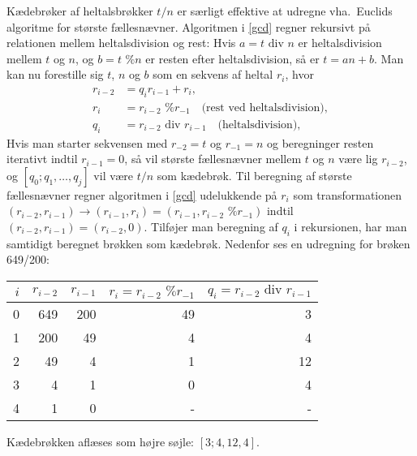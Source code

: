 Kædebrøker af heltalsbrøkker $t/n$ er særligt effektive at udregne vha.\ Euclids algoritme for største fællesnævner. Algoritmen i \ref{gcd} regner rekursivt på relationen mellem heltalsdivision og rest: Hvis $a = t \text{ div } n$ er heltalsdivision mellem $t$ og $n$, og $b = t \text{ \% } n$ er resten efter heltalsdivision, så er $t = a n + b$. Man kan nu forestille sig $t$, $n$ og $b$ som en sekvens af heltal $r_i$, hvor
\begin{align}
  r_{i-2} &= q_i r_{i-1} + r_i,
  \\r_i &= r_{i-2}\text{ \% }r_{-1}\quad\text{(rest ved heltalsdivision)},
  \\q_i &= r_{i-2}\text{ div }r_{i-1}\quad\text{(heltalsdivision)},
\end{align}
Hvis man starter sekvensen med $r_{-2} = t$ og $r_{-1}=n$ og beregninger resten iterativt indtil $r_{i-1}=0$, så vil største fællesnævner mellem $t$ og $n$ være lig $r_{i-2}$, og $[q_0; q_1,\ldots,q_j]$ vil være $t/n$ som kædebrøk. Til beregning af største fællesnævner regner algoritmen i \ref{gcd} udelukkende på $r_i$ som transformationen $(r_{i-2}, r_{i-1}) \rightarrow (r_{i-1}, r_i)  = (r_{i-1}, r_{i-2}\text{ \% }r_{-1})$ indtil $(r_{i-2}, r_{i-1}) = (r_{i-2},0)$. Tilføjer man beregning af $q_i$ i rekursionen, har man samtidigt beregnet brøkken som kædebrøk. Nedenfor ses en udregning for brøken 649/200:
\begin{center}
  \begin{tabular}{|r|r|r|r|r|}
    \hline
    $i$ & $r_{i-2}$ & $r_{i-1}$ & $r_i = r_{i-2}\text{ \% }r_{-1} $ & $q_i = r_{i-2} \text{ div } r_{i-1}$\\
    \hline
    0 & 649 & 200 & 49 & 3 \\
    1 & 200 & 49 & 4 & 4\\
    2 & 49 & 4 & 1  & 12\\
    3 & 4 & 1 & 0  & 4\\
    4 & 1 & 0 & -  & -\\
    \hline
  \end{tabular}
\end{center}
Kædebrøkken aflæses som højre søjle: $[3; 4, 12, 4]$.

